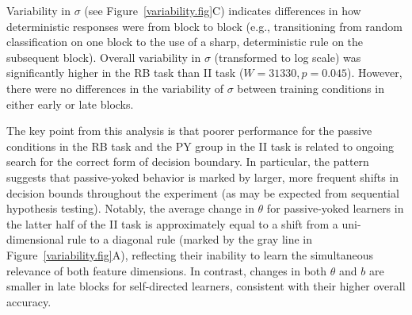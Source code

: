 \documentclass[3p,twocolumn,authoryear,10pt]{elsarticle}
\begin{document}
Variability in $\sigma$ (see Figure~\ref{variability.fig}C) indicates differences in how deterministic responses were from block to block (e.g., transitioning from random classification on one block to the use of a sharp, deterministic rule on the subsequent block). Overall variability in $\sigma$ (transformed to log scale) was significantly higher in the RB task than II task ($W=31330, p=0.045$). However, there were no differences in the variability of $\sigma$  between training conditions in either early or late blocks. 

The key point from this analysis is that poorer performance for the passive conditions in the RB task and the PY group in the II task is related to ongoing search for the correct form of decision boundary.  In particular, the pattern suggests that passive-yoked behavior is marked by larger, more frequent shifts in decision bounds throughout the experiment (as may be expected from sequential hypothesis testing). Notably, the average change in $\theta$ for passive-yoked learners in the latter half of the II task is approximately equal to a shift from a uni-dimensional rule to a diagonal rule (marked by the gray line in Figure~\ref{variability.fig}A), reflecting their inability to learn the simultaneous relevance of both feature dimensions. In contrast, changes in both $\theta$ and $b$ are smaller in late blocks for self-directed learners, consistent with their higher overall accuracy. 










%
\end{document}
